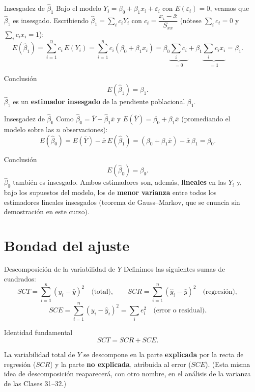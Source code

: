 \documentclass[aspectratio=169,11pt]{beamer}
\begin{document}
\begin{frame}{Insesgadez de $\hat\beta_1$}
Bajo el modelo $Y_i=\beta_0+\beta_1 x_i+\varepsilon_i$ con $E(\varepsilon_i)=0$, veamos que $\hat\beta_1$ es insesgado. Escribiendo $\hat\beta_1 = \sum_i c_i Y_i$ con $c_i = \dfrac{x_i-\bar x}{S_{xx}}$ (nótese $\sum_i c_i = 0$ y $\sum_i c_i x_i = 1$):
\[
E(\hat\beta_1) = \sum_{i=1}^n c_i\, E(Y_i) = \sum_{i=1}^n c_i(\beta_0+\beta_1 x_i) = \beta_0\underbrace{\sum_i c_i}_{=0} + \beta_1 \underbrace{\sum_i c_i x_i}_{=1} = \beta_1.
\]

\begin{block}{Conclusión}
\[
E(\hat\beta_1) = \beta_1.
\]
$\hat\beta_1$ es un \textbf{estimador insesgado} de la pendiente poblacional $\beta_1$.
\end{block}
\end{frame}

\begin{frame}{Insesgadez de $\hat\beta_0$}
Como $\hat\beta_0 = \bar Y - \hat\beta_1 \bar x$ y $E(\bar Y) = \beta_0+\beta_1\bar x$ (promediando el modelo sobre las $n$ observaciones):
\[
E(\hat\beta_0) = E(\bar Y) - \bar x\, E(\hat\beta_1) = (\beta_0+\beta_1\bar x) - \bar x\,\beta_1 = \beta_0.
\]

\begin{block}{Conclusión}
\[
E(\hat\beta_0) = \beta_0.
\]
$\hat\beta_0$ también es insesgado. Ambos estimadores son, además, \textbf{lineales} en las $Y_i$ y, bajo los supuestos del modelo, los de \textbf{menor varianza} entre todos los estimadores lineales insesgados (teorema de Gauss--Markov, que se enuncia sin demostración en este curso).
\end{block}
\end{frame}

\section{Bondad del ajuste}

\begin{frame}{Descomposición de la variabilidad de $Y$}
Definimos las siguientes sumas de cuadrados:
\[
SCT = \sum_{i=1}^n (y_i-\bar y)^2 \quad \text{(total)}, \qquad
SCR = \sum_{i=1}^n (\hat y_i-\bar y)^2 \quad \text{(regresión)},
\]
\[
SCE = \sum_{i=1}^n (y_i-\hat y_i)^2 = \sum_i e_i^2 \quad \text{(error o residual)}.
\]

\begin{block}{Identidad fundamental}
\[
SCT = SCR + SCE.
\]
\end{block}
La variabilidad total de $Y$ se descompone en la parte \textbf{explicada} por la recta de regresión ($SCR$) y la parte \textbf{no explicada}, atribuida al error ($SCE$). (Esta misma idea de descomposición reaparecerá, con otro nombre, en el análisis de la varianza de las Clases 31--32.)
\end{frame}
\end{document}
